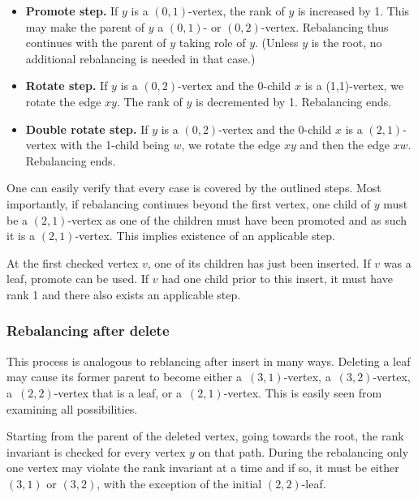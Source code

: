 \begin{itemize}
	\item \textbf{Promote step.} If $y$ is a $(0,1)$-vertex, the rank of $y$ is increased by 1. This may make the parent of $y$ a $(0,1)$- or $(0,2)$-vertex. Rebalancing thus continues with the parent of $y$ taking role of $y$. (Unless $y$ is the root, no additional rebalancing is needed in that case.)
	\item \textbf{Rotate step.} If $y$ is a $(0,2)$-vertex and the 0-child $x$ is a (1,1)-vertex, we rotate the edge $xy$. The rank of $y$ is decremented by 1. Rebalancing ends.
	\item \textbf{Double rotate step.} If $y$ is a $(0,2)$-vertex and the 0-child $x$ is a $(2,1)$-vertex with the 1-child being $w$, we rotate the edge $xy$ and then the edge $xw$. Rebalancing ends.
\end{itemize}

One can easily verify that every case is covered by the outlined steps. Most importantly, if rebalancing continues beyond the first vertex, one child of $y$ must be a $(2,1)$-vertex as one of the children must have been promoted and as such it is a $(2,1)$-vertex. This implies existence of an applicable step. 

At the first checked vertex $v$, one of its children has just been inserted. If $v$ was a leaf, promote can be used. If $v$ had one child prior to this insert, it must have rank 1 and there also exists an applicable step. 



\subsubsection*{Rebalancing after delete}

This process is analogous to reblancing after insert in many ways. Deleting a leaf may cause its former parent to become either a~$(3,1)$-vertex, a~$(3,2)$-vertex, a~$(2,2)$-vertex that is a leaf, or a~$(2,1)$-vertex. This is easily seen from examining all possibilities. 

Starting from the parent of the deleted vertex, going towards the root, the rank invariant is checked for every vertex $y$ on that path.  During the rebalancing only one vertex may violate the rank invariant at a time and if so, it must be either $(3,1)$ or $(3,2)$, with the exception of the initial $(2,2)$-leaf.

